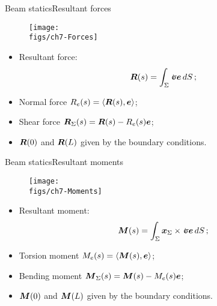 
\begin{frame}{Beam statics}{Resultant forces}

\begin{figure}
\centering\texttt{[image: \\figs/ch7-Forces]}
\end{figure}

\begin{itemize}
\item Resultant force:
\begin{displaymath}
\Fres(s)=\int_\Sigma\stress\ev\,\id S\,;
\end{displaymath}
\item Normal force $R_e(s)=\left\langle{{\boldsymbol{R}}(s),{\boldsymbol{e}}}\right\rangle$;
\item Shear force ${\boldsymbol{R}}_\Sigma(s)={\boldsymbol{R}}(s)-R_e(s){\boldsymbol{e}}$;
\item ${\boldsymbol{R}}(0)$ and ${\boldsymbol{R}}(L)$ given by the boundary conditions.
\end{itemize}

\end{frame}

\begin{frame}{Beam statics}{Resultant moments}

\begin{figure}
\centering\texttt{[image: \\figs/ch7-Moments]}
\end{figure}

\begin{itemize}
\item Resultant moment:
\begin{displaymath}
\Mres(s)=\int_\Sigma\xv_\Sigma\times\stress\ev\,\id S\,;
\end{displaymath}
\item Torsion moment $M_e(s)=\left\langle{{\boldsymbol{M}}(s),{\boldsymbol{e}}}\right\rangle$;
\item Bending moment ${\boldsymbol{M}}_\Sigma(s)={\boldsymbol{M}}(s)-M_e(s){\boldsymbol{e}}$;
\item ${\boldsymbol{M}}(0)$ and ${\boldsymbol{M}}(L)$ given by the boundary conditions.
\end{itemize}

\end{frame}

